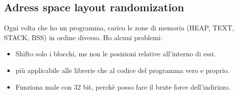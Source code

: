 \documentclass[a4paper,12pt]{article}
\begin{document}
\subsection{Adress space layout randomization}
Ogni volta che ho un programma, carico le zone di memoria (HEAP, TEXT, STACK, BSS) in ordine diverso. Ho alcuni problemi:
\begin{itemize}
\item Shifto solo i blocchi, ms non le posizioni relative all'interno di essi.
\item \E più applicabile alle librerie che al codice del programma vero e proprio.
\item Funziona male con 32 bit, perchè posso fare il brute force dell'indirizzo.
\end{itemize}
\end{document}
